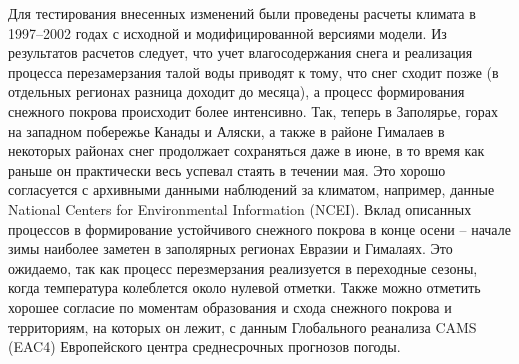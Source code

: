 \documentclass[a4paper, fontsize=14pt]{scrartcl}
\begin{document}
Для тестирования внесенных изменений были проведены расчеты климата в 1997--2002 годах с исходной и модифицированной версиями модели. Из результатов расчетов следует, что учет влагосодержания снега и реализация процесса перезамерзания талой воды приводят к тому, что снег сходит позже (в отдельных регионах разница доходит до месяца), а процесс формирования снежного покрова происходит более интенсивно. Так, теперь в Заполярье, горах на западном побережье Канады и Аляски, а также в районе Гималаев в некоторых районах снег продолжает сохраняться даже в июне, в то время как раньше он практически весь успевал стаять в течении мая. Это хорошо согласуется с архивными данными наблюдений за климатом, например, данные National Centers for Environmental Information (NCEI). Вклад описанных процессов в формирование устойчивого снежного покрова в конце осени -- начале зимы наиболее заметен в заполярных регионах Евразии и Гималаях. Это ожидаемо, так как процесс перезмерзания реализуется в переходные сезоны, когда температура колеблется около нулевой отметки. Также можно отметить хорошее согласие по моментам образования и схода снежного покрова и территориям, на которых он лежит, с данным Глобального реанализа CAMS (EAC4) Европейского центра среднесрочных прогнозов погоды.
\end{document}
